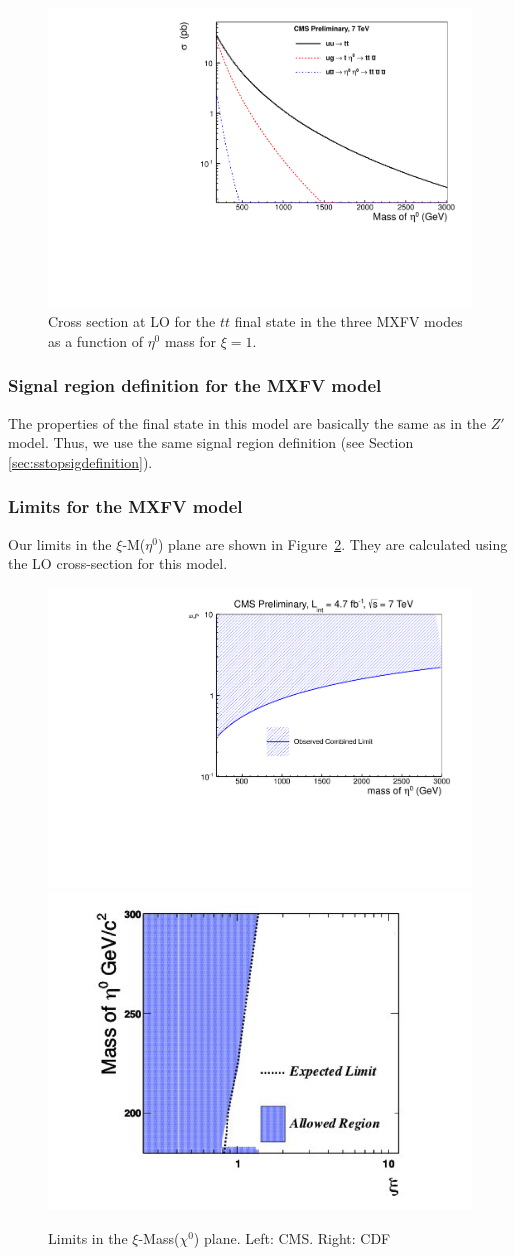 \begin{figure}[htb]
\begin{center}
\includegraphics[width=0.55\linewidth]{figs/mxvxsec.pdf}
\caption{Cross section at LO for the $tt$ final state in the three MXFV modes
as a function of $\eta^0$ mass for $\xi = 1$.
\label{fig:mxvxsec}}
\end{center}
\end{figure}

\subsubsection{Signal region definition for the MXFV model}
\label{sec:mxfvdefinition}
The properties of the final state in this model are basically the same as in the $Z'$ model.
Thus, we use the same signal region definition (see Section \ref{sec:sstopsigdefinition}).


\subsubsection{Limits for the MXFV model}
\label{sec:mxfvlimits}
Our limits in the $\xi$-M($\eta^0$) plane are shown in 
Figure~\ref{fig:MxVExcl}.
They are calculated using the LO cross-section for this model.

\begin{figure}[htb]
\begin{center}
\includegraphics[width=0.45\linewidth]{figs/MxVExclCombined.pdf}
\includegraphics[width=0.45\linewidth]{figs/CDFlimit.png}
\caption{Limits in the $\xi$-Mass($\chi^0$) plane.  Left: CMS.  Right: CDF
\label{fig:MxVExcl}}
\end{center}
\end{figure}

